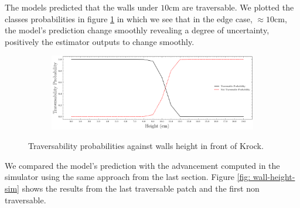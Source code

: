\documentclass[../document.tex]{subfiles}
\begin{document}
The models predicted that the walls under $10$cm are traversable. We plotted the classes probabilities in figure \ref{fig : walls-height-preds} in which we see that in the edge case, $\approx 10$cm, the model's prediction change smoothly revealing a degree of uncertainty, positively the estimator outputs to change smoothly.
\begin{figure}[htbp]
    \centering
\begin{subfigure}[b]{1\textwidth}
    \includegraphics[width=\linewidth]{../img/5/custom_patches/walls_increasing/predictions.png}
    \end{subfigure}
    \caption{Traversability probabilities against walls height in front of Krock.}
\label{fig : walls-height-preds}
\end{figure}
We compared the model's prediction with the advancement computed in the simulator using the same approach from the last section. Figure \ref{fig: wall-height-sim} shows the results from the last traversable patch and the first non traversable.
\end{document}
